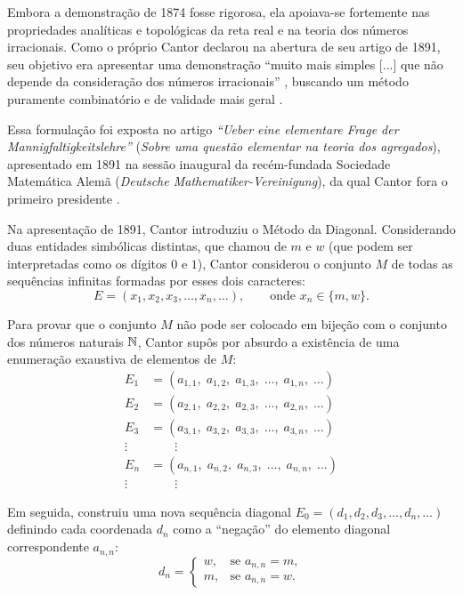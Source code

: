 Embora a demonstração de 1874 fosse rigorosa, ela apoiava-se fortemente nas propriedades analíticas e topológicas da reta real e na teoria dos números irracionais. Como o próprio Cantor declarou na abertura de seu artigo de 1891, seu objetivo era apresentar uma demonstração ``muito mais simples [...] que não depende da consideração dos números irracionais'' \parencite[p.~434]{bertato2023}, buscando um método puramente combinatório e de validade mais geral \parencite[p.~165]{dauben1990}.

Essa formulação foi exposta no artigo \emph{``Ueber eine elementare Frage der Mannigfaltigkeitslehre''} (\emph{Sobre uma questão elementar na teoria dos agregados}), apresentado em 1891 na sessão inaugural da recém-fundada Sociedade Matemática Alemã (\emph{Deutsche Mathematiker-Vereinigung}), da qual Cantor fora o primeiro presidente \parencite[p.~159]{dauben1990}.

Na apresentação de 1891, Cantor introduziu o Método da Diagonal. Considerando duas entidades simbólicas distintas, que chamou de \(m\) e \(w\) (que podem ser interpretadas como os dígitos \(0\) e \(1\)), Cantor considerou o conjunto \(M\) de todas as sequências infinitas formadas por esses dois caracteres:
\[
    E = (x_1, x_2, x_3, \dots, x_n, \dots), \qquad \text{onde } x_n \in \{m, w\}.
\]

Para provar que o conjunto \(M\) não pode ser colocado em bijeção com o conjunto dos números naturais \(\mathbb{N}\), Cantor supôs por absurdo a existência de uma enumeração exaustiva de elementos de \(M\):
\begin{align*}
    E_1    & = (a_{1,1}, \; a_{1,2}, \; a_{1,3}, \; \dots, \; a_{1,n}, \; \dots) \\
    E_2    & = (a_{2,1}, \; a_{2,2}, \; a_{2,3}, \; \dots, \; a_{2,n}, \; \dots) \\
    E_3    & = (a_{3,1}, \; a_{3,2}, \; a_{3,3}, \; \dots, \; a_{3,n}, \; \dots) \\
    \vdots & \qquad \vdots                                                       \\
    E_n    & = (a_{n,1}, \; a_{n,2}, \; a_{n,3}, \; \dots, \; a_{n,n}, \; \dots) \\
    \vdots & \qquad \vdots
\end{align*}

Em seguida, construiu uma nova sequência diagonal \(E_0 = (d_1, d_2, d_3, \dots, d_n, \dots)\) definindo cada coordenada \(d_n\) como a ``negação'' do elemento diagonal correspondente \(a_{n,n}\):
\[
    d_n =
    \begin{cases}
        w, & \text{se } a_{n,n} = m, \\
        m, & \text{se } a_{n,n} = w.
    \end{cases}
\]

